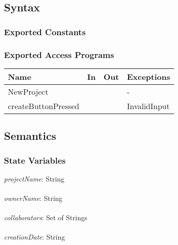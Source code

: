 \documentclass[12pt, titlepage]{article}
\begin{document}
	\subsection{Syntax}
	
	\subsubsection{Exported Constants}
	
	\subsubsection{Exported Access Programs}
	
	\begin{center}
		\begin{tabular}{p{2cm} p{4cm} p{4cm} p{2cm}}
			\hline
			\textbf{Name} & \textbf{In} & \textbf{Out} & \textbf{Exceptions} \\
			\hline
			NewProject &  &  & - \\
			\hline
			createButtonPressed &  &  & InvalidInput \\
			\hline
		\end{tabular}
	\end{center}
	
	\subsection{Semantics}
	
	\subsubsection{State Variables}
	\textit{projectName}: String \\\\ 
	\textit{ownerName}: String \\\\ 
	\textit{collaborators}: Set of Strings \\\\
	\textit{creationDate}: String \\\\
	
\end{document}
